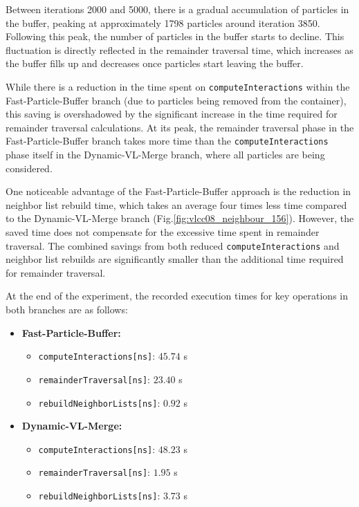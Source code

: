 Between iterations 2000 and 5000, there is a gradual accumulation of particles in the buffer, peaking at approximately 1798 particles around iteration 3850. Following this peak, the number of particles in the buffer starts to decline. This fluctuation is directly reflected in the remainder traversal time, which increases as the buffer fills up and decreases once particles start leaving the buffer. 

While there is a reduction in the time spent on \texttt{computeInteractions} within the Fast-Particle-Buffer branch (due to particles being removed from the container), this saving is overshadowed by the significant increase in the time required for remainder traversal calculations. At its peak, the remainder traversal phase in the Fast-Particle-Buffer branch takes more time than the \texttt{computeInteractions} phase itself in the Dynamic-VL-Merge branch, where all particles are being considered. 

One noticeable advantage of the Fast-Particle-Buffer approach is the reduction in neighbor list rebuild time, which takes an average four times less time compared to the Dynamic-VL-Merge branch (Fig.\ref{fig:vlcc08_neighbour_156}). However, the saved time does not compensate for the excessive time spent in remainder traversal. The combined savings from both reduced \texttt{computeInteractions} and neighbor list rebuilds are significantly smaller than the additional time required for remainder traversal.

At the end of the experiment, the recorded execution times for key operations in both branches are as follows:

\begin{itemize}
    \item \textbf{Fast-Particle-Buffer:}
    \begin{itemize}
        \item \texttt{computeInteractions[ns]}: $45.74$ s
        \item \texttt{remainderTraversal[ns]}: $23.40$ s
        \item \texttt{rebuildNeighborLists[ns]}: $0.92$ s
    \end{itemize}
    \item \textbf{Dynamic-VL-Merge:}
    \begin{itemize}
        \item \texttt{computeInteractions[ns]}: $48.23$ s
        \item \texttt{remainderTraversal[ns]}: $1.95$ s
        \item \texttt{rebuildNeighborLists[ns]}: $3.73$ s
    \end{itemize}
\end{itemize}

